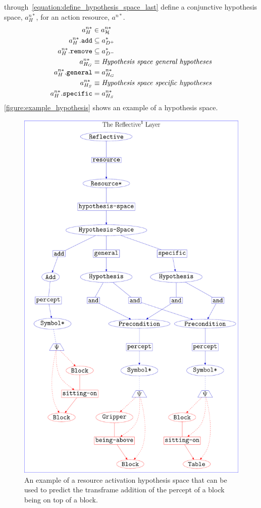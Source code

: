 through\ \ref{equation:define_hypothesis_space_last} define a
conjunctive hypothesis space, $a_H^{n*}$, for an action resource,
$a^{n*}$.
\begin{align}
\label{equation:define_hypothesis_space_first}
                           a_H^{n*} &\in a_{\mathcal{H}}^{n*} \\
           a_H^{n*}.\text{\tt{add}} &\subseteq a^*_{D^+} \\
        a_H^{n*}.\text{\tt{remove}} &\subseteq a^*_{D^-} \\
                        a_{H_G}^{n*} &\equiv \text{\emph{Hypothesis space general hypotheses}} \\
       a_H^{n*}.\text{\tt{general}} &= a_{H_G}^{n*} \\
                        a_{H_S}^{n*} &\equiv \text{\emph{Hypothesis space specific hypotheses}} \\
\label{equation:define_hypothesis_space_last}
      a_H^{n*}.\text{\tt{specific}} &= a_{H_S}^{n*}
\end{align}
{\mbox{\autoref{figure:example_hypothesis}}} shows an example of a
hypothesis space.
\begin{figure}
\center
\includegraphics[width=12cm]{gfx/example_hypothesis}
\caption[An example of a resource activation hypothesis space.]{An
  example of a resource activation hypothesis space that can be used
  to predict the transframe addition of the percept of a block being
  on top of a block.}
\label{figure:example_hypothesis}
\end{figure}

